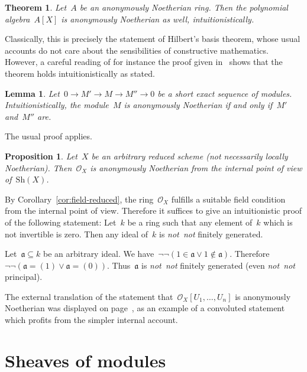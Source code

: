 \documentclass[10pt,reqno,a4paper]{amsbook}
\makeatletter
\theoremstyle{definition}
\theoremstyle{plain}
\newtheorem{prop}[defn]{Proposition}
\newtheorem{lemma}[defn]{Lemma}
\newtheorem{thm}[defn]{Theorem}
\theoremstyle{remark}
\renewcommand{\O}{\mathcal{O}}
\newcommand{\aaa}{\mathfrak{a}}
\newcommand{\Sh}{\mathrm{Sh}}
\newcommand{\?}{\,{:}\,}
\renewcommand{\_}{\mathpunct{.}\,}
\newcommand{\notnot}{\emph{not~not}\xspace}
\renewenvironment{proof}[1][\proofname]{\par
  \pushQED{\qed}%
  \normalfont \topsep6\p@\@plus6\p@\relax
  \trivlist
  \item[\hskip\labelsep
        \itshape
    #1\@addpunct{.}]\ignorespaces
}{%
  \popQED\endtrivlist\@endpefalse
}
\makeatother
\begin{document}
{\begin{thm}\label{thm:hilbert}
Let~$A$ be an anonymously Noetherian ring. Then the polynomial
algebra~$A[X]$ is anonymously Noetherian as well, intuitionistically.
\end{thm}
\begin{proof}Classically, this is precisely the statement of Hilbert's basis
theorem, whose usual accounts do not care about the sensibilities of
constructive mathematics. However, a careful reading of for instance the proof
given in~\cite[Theorem~7.5]{atiyah:macdonald:commutative-algebra} shows that
the theorem holds intuitionistically as stated.
\end{proof}

\begin{lemma}Let~$0 \to M' \to M \to M'' \to 0$ be a short exact sequence of
modules. Intuitionistically, the module~$M$ is anonymously Noetherian if and only
if~$M'$ and~$M''$ are.
\end{lemma}

\begin{proof}The usual proof applies.\end{proof}

\begin{prop}\label{prop:ox-anonymously-noetherian}
Let~$X$ be an arbitrary reduced scheme (not necessarily locally
Noetherian). Then~$\O_X$ is anonymously Noetherian from the internal point of view
of~$\Sh(X)$.\end{prop}
\begin{proof}By Corollary~\ref{cor:field-reduced}, the ring~$\O_X$ fulfills a
suitable field condition from the internal point of view. Therefore it suffices
to give an intuitionistic proof of the following statement: Let~$k$ be a ring such that
any element of~$k$ which is not invertible is zero. Then any ideal of~$k$ is
\notnot finitely generated.

Let~$\aaa \subseteq k$ be an arbitrary ideal. We have~$\neg\neg(1 \in \aaa \vee
1 \not\in \aaa)$. Therefore~$\neg\neg(\aaa = (1) \vee \aaa = (0))$. Thus~$\aaa$
is \notnot finitely generated (even \notnot principal).
\end{proof}

The external translation of the statement
that~$\O_X[U_1,\ldots,U_n]$ is anonymously Noetherian was displayed on
page~\pageref{page:convoluted-statement}, as an example of a convoluted
statement which profits from the simpler internal account.

}


\section{Sheaves of modules}
\label{sect:sheaves-of-modules}
\end{document}

